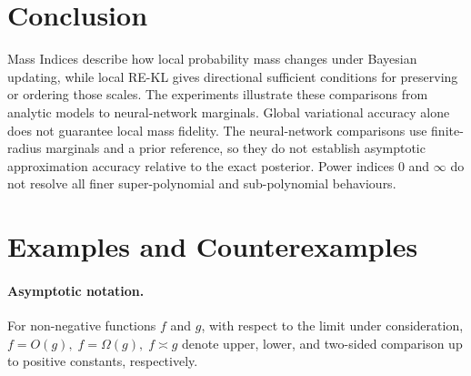 \documentclass[11pt,a4paper]{article}
\theoremstyle{compactplain}
\theoremstyle{compactdefinition}
\numberwithin{equation}{section}
\begin{document}
\FloatBarrier
{}
\section{Conclusion}
Mass Indices describe how local probability mass changes under Bayesian updating, while local RE-KL gives directional sufficient conditions for preserving or ordering those scales. The experiments illustrate these comparisons from analytic models to neural-network marginals. Global variational accuracy alone does not guarantee local mass fidelity. The neural-network comparisons use finite-radius marginals and a prior reference, so they do not establish asymptotic approximation accuracy relative to the exact posterior. Power indices \(0\) and \(\infty\) do not resolve all finer super-polynomial and sub-polynomial behaviours.

{}

\begingroup
\small
{}

\endgroup


\clearpage

\appendix

\section{Examples and Counterexamples}
\label{app:examples-counterexamples}

\paragraph{Asymptotic notation.}
For non-negative functions \(f\) and \(g\), with respect to the limit under consideration,
\(f=O(g),\;f=\Omega(g),\; f\asymp g\) denote upper, lower, and two-sided comparison up to positive constants, respectively.
\end{document}
